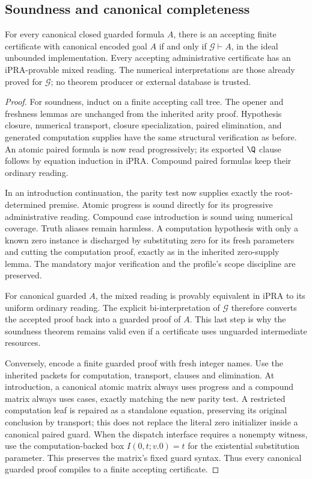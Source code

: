 \subsection{Soundness and canonical completeness}
\begin{theorem}
For every canonical closed guarded formula $A$, there is an accepting
finite certificate with canonical encoded goal $A$ if and only if
$\mathcal G\vdash A$, in the ideal unbounded implementation.
Every accepting administrative certificate has an iPRA-provable mixed
reading. The numerical interpretations are those already proved for
$\mathcal G$; no theorem producer or external database is trusted.
\end{theorem}
\begin{proof}
For soundness, induct on a finite accepting call tree. The opener and
freshness lemmas are unchanged from the inherited arity proof.
Hypothesis closure, numerical transport, closure specialization,
paired elimination, and generated computation supplies have the same
structural verification as before. An atomic paired formula is now read
progressively; its exported $\Q$ clause follows by equation induction in
iPRA. Compound paired formulas keep their ordinary reading.

In an introduction continuation, the parity test now supplies exactly
the root-determined premise. Atomic progress is sound directly for its
progressive administrative reading. Compound case introduction is sound
using numerical coverage. Truth aliases remain harmless. A computation
hypothesis with only a known zero instance is discharged by substituting
zero for its fresh parameters and cutting the computation proof, exactly
as in the inherited zero-supply lemma. The mandatory major verification
and the profile's scope discipline are preserved.

For canonical guarded $A$, the mixed reading is provably equivalent in
iPRA to its uniform ordinary reading. The explicit bi-interpretation of
$\mathcal G$ therefore converts the accepted proof back into a guarded
proof of $A$. This last step is why the soundness theorem remains valid
even if a certificate uses unguarded intermediate resources.

Conversely, encode a finite guarded proof with fresh integer names.
Use the inherited packets for computation, transport, clauses and
elimination. At introduction, a canonical atomic matrix always uses
progress and a compound matrix always uses cases, exactly matching the
new parity test. A restricted computation leaf is repaired as a
standalone equation, preserving its original conclusion by transport;
this does not replace the literal zero initializer inside a canonical
paired guard. When the dispatch interface requires a nonempty witness,
use the computation-backed box $I(0,t;v.0)=t$ for the existential
substitution parameter. This preserves the matrix's fixed guard syntax.
Thus every
canonical guarded proof compiles to a finite accepting certificate.
\end{proof}

